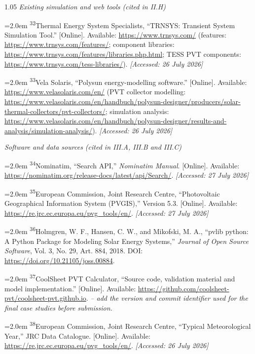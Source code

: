 \documentclass[12pt,letterpaper]{article}
\DeclareRobustCommand{\refanchor}[1]{\hypertarget{ref:#1}{#1}} %
\newcommand{\referenceheading}[1]{\vspace{1.55em}\textit{#1}\par\vspace{0.45em}}
\newcommand{\refentry}[1]{\hangindent=2.0em\hangafter=1 #1\par\vspace{0.2em}}
\begin{document}
\begin{spacing}{1.05}
\referenceheading{Existing simulation and web tools (cited in II.H)}

\refentry{
\textsuperscript{\refanchor{32}}Thermal Energy System Specialists, ``TRNSYS: Transient System Simulation Tool.'' [Online]. Available: \url{https://www.trnsys.com/} (features: \url{https://www.trnsys.com/features/}; component libraries: \url{https://www.trnsys.com/features/libraries.php.html}; TESS PVT components: \url{https://www.trnsys.com/tess-libraries/}). \textit{[Accessed: 26 July 2026]}
}

\refentry{
\textsuperscript{\refanchor{33}}Vela Solaris, ``Polysun energy-modelling software.'' [Online]. Available: \url{https://www.velasolaris.com/en/} (PVT collector modelling: \url{https://www.velasolaris.com/en/handbuch/polysun-designer/producers/solar-thermal-collectors/pvt-collectors/}; simulation analysis: \url{https://www.velasolaris.com/en/handbuch/polysun-designer/results-and-analysis/simulation-analysis/}). \textit{[Accessed: 26 July 2026]}
}

\referenceheading{Software and data sources (cited in III.A, III.B and III.C)}

\refentry{
\textsuperscript{\refanchor{34}}Nominatim, ``Search API,'' \textit{Nominatim Manual}. [Online]. Available: \url{https://nominatim.org/release-docs/latest/api/Search/}. \textit{[Accessed: 27 July 2026]}
}

\refentry{
\textsuperscript{\refanchor{35}}European Commission, Joint Research Centre, ``Photovoltaic Geographical Information System (PVGIS),'' Version 5.3. [Online]. Available: \url{https://re.jrc.ec.europa.eu/pvg_tools/en/}. \textit{[Accessed: 27 July 2026]}
}

\refentry{
\textsuperscript{\refanchor{36}}Holmgren, W. F., Hansen, C. W., and Mikofski, M. A., ``pvlib python: A Python Package for Modeling Solar Energy Systems,'' \textit{Journal of Open Source Software}, Vol. 3, No. 29, Art. 884, 2018. DOI: \url{https://doi.org/10.21105/joss.00884}.
}

\refentry{
\textsuperscript{\refanchor{37}}CoolSheet PVT Calculator, ``Source code, validation material and model implementation.'' [Online]. Available: \url{https://github.com/coolsheet-pvt/coolsheet-pvt.github.io}. \textit{-- add the version and commit identifier used for the final case studies before submission.}
}

\refentry{
\textsuperscript{\refanchor{38}}European Commission, Joint Research Centre, ``Typical Meteorological Year,'' JRC Data Catalogue. [Online]. Available: \url{https://re.jrc.ec.europa.eu/pvg_tools/en/}. \textit{[Accessed: 26 July 2026]}
}


\end{spacing}
\end{document}

